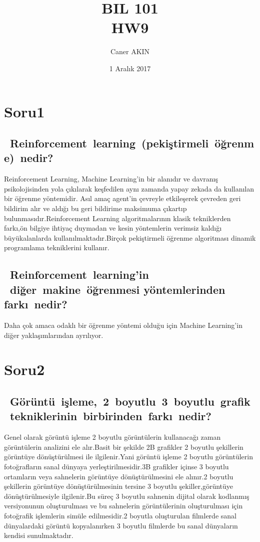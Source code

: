 \documentclass[12pt]{article}
\begin{document}
\title{BIL 101 \\ HW9}
\author{Caner AKIN}
\date{ 1 Aralık 2017}
\maketitle
\newpage
\section{Soru1}
\subsection{ Reinforcement learning (pekiştirmeli öğrenme) nedir?}
Reinforcement Learning, Machine Learning’in bir alanıdır ve davranış psikolojisinden
yola çıkılarak keşfedilen aynı zamanda yapay zekada da kullanılan bir öğrenme yöntemidir.
Asıl amaç agent'in çevreyle etkileşerek çevreden geri bildirim alır ve aldığı bu geri
bildirime maksimuma çıkartıp bulunmasıdır.Reinforcement Learning algoritmalarının klasik 
tekniklerden farkı,ön bilgiye ihtiyaç duymadan ve kesin yöntemlerin verimsiz kaldığı 
büyükalanlarda kullanılmaktadır.Birçok pekiştirmeli öğrenme algoritması dinamik programlama 
tekniklerini kullanır.
\par
\subsection{ Reinforcement learning'in  diğer makine öğrenmesi \-yöntemlerinden farkı nedir?}
Daha çok amaca odaklı bir öğrenme yöntemi olduğu için Machine Learning'in diğer yaklaşımlarından
ayrılıyor.
\newpage
\section{Soru2}
\subsection{ Görüntü işleme, 2 boyutlu 3 boyutlu grafik tekniklerinin birbirinden farkı nedir?}
Genel olarak görüntü işleme 2 boyutlu görüntülerin kullanacağı zaman görüntülerin
analizini ele alır.Basit bir şekilde 2B grafikler 2 boyutlu şekillerin görüntüye 
dönüştürülmesi ile ilgilenir.Yani görüntü işleme 2 boyutlu görüntülerin fotoğrafların sanal
dünyaya yerleştirilmesidir.3B grafikler içinse 3 boyutlu ortamların veya sahnelerin görüntüye
dönüştürülmesini ele alınır.2 boyutlu şekillerin görüntüye dönüştürülmesinin tersine 3 boyutlu
şekiller,görüntüye dönüştürülmesiyle ilgilenir.Bu süreç 3 boyutlu sahnenin dijital olarak
kodlanmış versiyonunun oluşturulması ve bu sahnelerin görüntülerinin oluşturulması için
fotoğrafik işlemlerin simüle edilmesidir.2 boyutla oluşturulan filmlerde sanal dünyalardaki 
görüntü kopyalanırken 3 boyutlu filmlerde bu sanal dünyaların kendisi sunulmaktadır.
\end{document}
